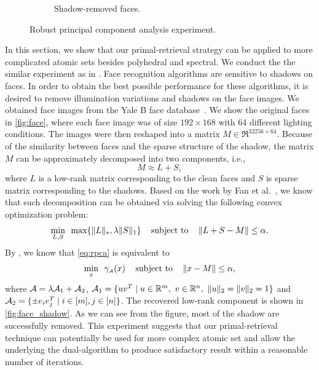 \begin{figure}[t]
\begin{subfigure}{.45\textwidth}
      \captionsetup{justification=centering}
      \caption{Shadow-removed faces.}
      \label{fig:face_shadow}
    \end{subfigure}
    \captionsetup{justification=centering}
    \caption{Robust principal component analysis experiment.}
\end{figure}

In this section, we show that our primal-retrieval strategy can be applied to more complicated atomic sets besides polyhedral and spectral. We conduct the the similar experiment as in \cite{candes2011robust}. Face recognition algorithms are sensitive to shadows on faces. In order to obtain the best possible performance for these algorithms, it is desired to remove illumination variations and shadows on the face images. We obtained face images from the Yale B face database~\cite{georghiades2001few}. We show the original faces in \autoref{fig:face}, where each face image was of size $192\times 168$ with 64 different lighting conditions. The images were then reshaped into a matrix $M \in \Re^{32256 \times 64}$. Because of the similarity between faces and the sparse structure of the shadow, the matrix $M$ can be approximately decomposed into two components, i.e., 
\[M \approx L + S,\]
where $L$ is a low-rank matrix corresponding to the clean faces and $S$ is sparse matrix corresponding to the shadows. Based on the work by Fan et al.~\cite{fan2020polar}, we know that such decomposition can be obtained via solving the following convex optimization problem:
\begin{equation} \label{eq:rpca}
    \min_{L, S} \enspace \max\{\|L\|_*, \lambda \|S\|_1\}  \enspace \enspace\mathop{\hbox{\rm subject to}}\enspace  \enspace  \|L + S - M\| \leq \alpha.
\end{equation}
By \cite[Proposition~7.3]{fan2019alignment}, we know that \eqref{eq:rpca} is equivalent to 
\begin{equation} \label{eq:rpca2}
    \min_{x} \enspace \gamma_{\scriptscriptstyle\mathcal{A}}(x)  \enspace \enspace\mathop{\hbox{\rm subject to}}\enspace  \enspace  \|x - M\| \leq \alpha,
\end{equation}
where $\mathcal{A} = \lambda \mathcal{A}_1 + \mathcal{A}_2$, $\mathcal{A}_1 = \{uv^T \mid u \in \mathbb{R}^m,\ v \in \mathbb{R}^n,\ \|u\|_2=\|v\|_2 = 1\}$ and $\mathcal{A}_2 = \{\pm e_ie_j^T \mid i \in [m], j \in [n]\}$. The recovered low-rank component is shown in \autoref{fig:face_shadow}. As we can see from the figure, most of the shadow are successfully removed. This experiment suggests that our primal-retrieval technique can potentially be used for more complex atomic set and allow the underlying the dual-algorithm to produce satisfactory result within a reasonable number of iterations. 

